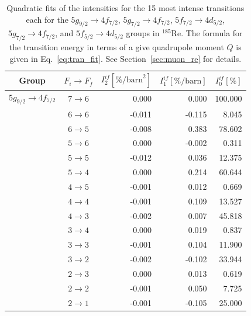 %
%
%
\begin{table}[b]
\caption{\label{tab:re185intens}%
Quadratic fits of the intensities for the 15 most intense transitions each for the $5g_{9/2}\rightarrow4f_{7/2}$, $5g_{7/2}\rightarrow4f_{7/2}$, $5f_{7/2}\rightarrow4d_{5/2}$, $5g_{7/2}\rightarrow4f_{7/2}$, and $5f_{5/2}\rightarrow4d_{5/2}$ groups in $^{185}$Re. The formula for the transition energy in terms of a give quadrupole moment $Q$ is given in Eq.~\eqref{eq:tran_fit}. See Section~\ref{sec:muon_re} for details.}
\centering
\begin{tiny}
\begin{tabular}{cc|rrr}
Group& $F_i \rightarrow F_f$ & $I_2^{if} [\%\text{/barn}^2]$ & $I_1^{if} [\%\text{/barn}]$ & $I_0^{if} [\%]$\\[1pt]\hline%
$5g_{9/2} \rightarrow 4f_{7/2}$  &  $7 \rightarrow 6$  &  0.000  &  0.000  &  100.000\\
&  $6 \rightarrow 6$  &  -0.011  &  -0.115  &  8.045\\
&  $6 \rightarrow 5$  &  -0.008  &  0.383  &  78.602\\
&  $5 \rightarrow 6$  &  0.000  &  -0.002  &  0.311\\
&  $5 \rightarrow 5$  &  -0.012  &  0.036  &  12.375\\
&  $5 \rightarrow 4$  &  0.000  &  0.214  &  60.644\\
&  $4 \rightarrow 5$  &  -0.001  &  0.012  &  0.669\\
&  $4 \rightarrow 4$  &  -0.001  &  0.109  &  13.527\\
&  $4 \rightarrow 3$  &  -0.002  &  0.007  &  45.818\\
&  $3 \rightarrow 4$  &  0.000  &  0.019  &  0.837\\
&  $3 \rightarrow 3$  &  -0.001  &  0.104  &  11.900\\
&  $3 \rightarrow 2$  &  -0.002  &  -0.102  &  33.944\\
&  $2 \rightarrow 3$  &  0.000  &  0.013  &  0.619\\
&  $2 \rightarrow 2$  &  -0.001  &  0.050  &  7.725\\
&  $2 \rightarrow 1$  &  -0.001  &  -0.105  &  25.000\\[7pt]


\end{tabular}
\end{tiny}
\end{table}
